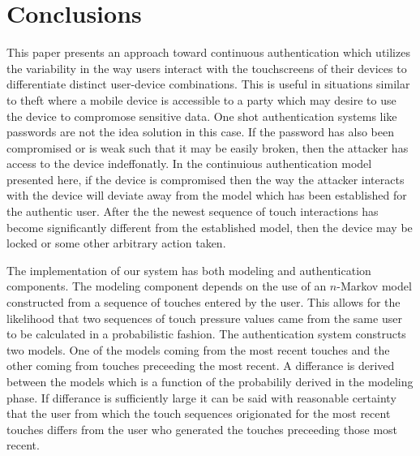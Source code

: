 \documentclass{acm_proc_article-sp}
\begin{document}
\section{Conclusions}
\label{sec:conclusions}
This paper presents an approach toward continuous authentication which utilizes the variability in the way users interact with the touchscreens of their devices to differentiate distinct user-device combinations. 
This is useful in situations similar to theft where a mobile device is accessible to a party which may desire to use the device to compromose sensitive data. One shot authentication systems like passwords are not the idea solution in this case. If the password has also been compromised or is weak such that it may be easily broken, then the attacker has access to the device indeffonatly. In the continuious authentication model presented here, if the device is compromised then the way the attacker interacts with the device will deviate away from the model which has been established for the authentic user. After the the newest sequence of touch interactions has become significantly different from the established model, then the device may be locked or some other arbitrary action taken. 

The implementation of our system has both modeling and authentication components. The modeling component depends on the use of an $n$-Markov model constructed from a sequence of touches entered by the user. This allows for the likelihood that two sequences of touch pressure values came from the same user to be calculated in a probabilistic fashion.
The authentication system constructs two models. One of the models coming from the most recent touches and the other coming from touches preceeding the most recent. A differance is derived between the models which is a function of the probabilily derived in the modeling phase. If differance is sufficiently large it can be said with reasonable certainty that the user from which the touch sequences origionated for the most recent touches differs from the user who generated the touches preceeding those most recent. 
\end{document}
